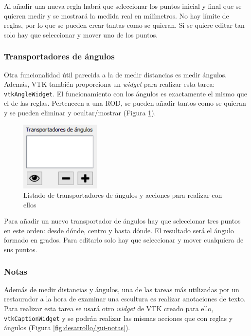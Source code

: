 Al añadir una nueva regla habrá que seleccionar los puntos inicial y final que se quieren medir y se mostrará la medida real en milímetros. No hay límite de reglas, por lo que se pueden crear tantas como se quieran. Si se quiere editar tan solo hay que seleccionar y mover uno de los puntos.

\subsubsection{Transportadores de ángulos}

Otra funcionalidad útil parecida a la de medir distancias es medir ángulos. Además, VTK también proporciona un \textit{widget} para realizar esta tarea: \texttt{vtkAngleWidget}. El funcionamiento con los ángulos es exactamente el mismo que el de las reglas. Pertenecen a una ROD, se pueden añadir tantos como se quieran y se pueden eliminar y ocultar/mostrar (Figura \ref{fig:desarrollo/gui-angulos}).

\begin{figure}[H]
	\centering
	\includegraphics[width=4cm]{imagenes/desarrollo/gui-angulos}
	\caption{Listado de transportadores de ángulos y acciones para realizar con ellos}
	\label{fig:desarrollo/gui-angulos}
\end{figure}

Para añadir un nuevo transportador de ángulos hay que seleccionar tres puntos en este orden: desde dónde, centro y hasta dónde. El resultado será el ángulo formado en grados. Para editarlo solo hay que seleccionar y mover cualquiera de sus puntos.

\subsubsection{Notas}

Además de medir distancias y ángulos, una de las tareas más utilizadas por un restaurador a la hora de examinar una escultura es realizar anotaciones de texto. Para realizar esta tarea se usará otro \textit{widget} de VTK creado para ello, \texttt{vtkCaptionWidget} y se podrán realizar las mismas acciones que con reglas y ángulos (Figura \ref{fig:desarrollo/gui-notas}).

